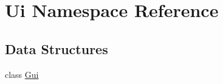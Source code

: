\hypertarget{namespaceUi}{
\section{Ui Namespace Reference}
\label{namespaceUi}
}
\subsection*{Data Structures}
\begin{DoxyCompactItemize}
\item 
class \hyperlink{classUi_1_1Gui}{Gui}
\end{DoxyCompactItemize}
